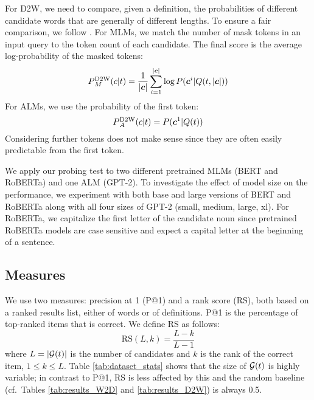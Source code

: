 \documentclass[11pt,a4paper]{article}
\def\uprm#1#2{\mbox{$_#2^{\hbox{\scriptsize #1}}$}}
\begin{document}
For D2W, we need to compare, given a definition, the probabilities of
different candidate words that are generally of different lengths.
To ensure a fair comparison,
we follow
. For MLMs, we
match the number of mask tokens in an input query to the
token count of each candidate. The final score is the average log-probability of the masked tokens:
\begin{equation*}
    P\uprm{D2W}{M}(c|t) =
    \frac{1}{|\bm{c}|}\sum_{i=1}^{|\bm{c}|}\log P(\bm{c}^i |
    Q(t,|\bm{c}|))
\end{equation*}
For ALMs, we use the probability of
the first token:
\begin{equation*}
    P\uprm{D2W}{A}(c|t) =
     P(\bm{c}^1 |
    Q(t))
\end{equation*}
Considering further tokens does not make sense since they
are often easily predictable from the first token.


We apply our probing test to two different pretrained
MLMs (BERT and
RoBERTa) and one ALM
(GPT-2). 
To investigate the effect of model
size on the performance, we experiment with both
base and large versions of BERT and RoBERTa
along with all four sizes of GPT-2 (small, medium,
large, xl). 
For RoBERTa, we capitalize the first letter of the candidate
noun  since pretrained RoBERTa models are case sensitive
and expect a capital letter at the beginning of a
sentence.


\subsection{Measures}
We use two measures: precision at 1 (P@1) and a rank score
(RS), both based on a ranked results list, either of words
or of definitions. P@1 is the percentage of top-ranked items
that is correct.
We define RS as follows:  
\begin{equation*}
    \text{RS}(L,k) = \frac{L-k}{L-1}
\end{equation*}
where $L=|{\cal G}(t)|$ is the number of candidates  and
$k$ is the rank of the correct item, $1 \leq k \leq L$.
Table \ref{tab:dataset_stats} shows that the size of ${\cal G}(t)$
is highly variable;
in contrast to P@1, RS is less affected by
this and the random baseline (cf.\ Tables
\ref{tab:results_W2D}
and \ref{tab:results_D2W}) is always 0.5.  
\end{document}
